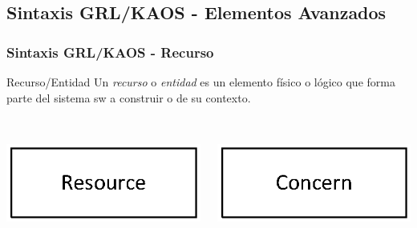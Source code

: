 \documentclass[slidestop,xcolor=pst,dvips,blue]{beamer}
\begin{document}
\subsection[Sintaxis GRL/KAOS (II)]{Sintaxis GRL/KAOS - Elementos Avanzados}

\begin{frame}[c]
    \frametitle{Sintaxis GRL/KAOS - Recurso}
    \begin{block}{Recurso/Entidad}
        Un \alert{\emph{recurso}} o \alert{\emph{entidad}} es un elemento físico o lógico que forma parte del sistema sw a construir o de su contexto.
        \ \\
        \ \\
        \begin{columns}[c]
            \begin{column}{0.50\linewidth}
                \centering \includegraphics[width=0.5\columnwidth,keepaspectratio=true]{images/objetivos/resource(GRL).eps}
            \end{column}
            \begin{column}{0.50\linewidth}
                \centering \includegraphics[width=0.5\columnwidth,keepaspectratio=true]{images/objetivos/concern(KAOS).eps}
            \end{column}
        \end{columns}
    \end{block}
\end{frame}
\end{document}
